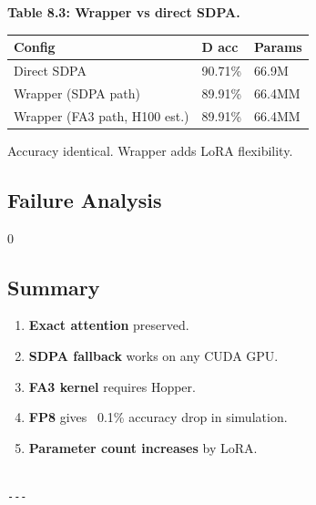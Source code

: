 \textbf{Table 8.3: Wrapper vs direct SDPA.}

\begin{table}[H]
\centering
\small
\begin{tabular}{lll}
\toprule
\textbf{Config} & \textbf{D acc} & \textbf{Params} \\
\midrule
Direct SDPA & 90.71\% & 66.9M \\
Wrapper (SDPA path) & 89.91\% & 66.4MM \\
Wrapper (FA3 path, H100 est.) & 89.91\% & 66.4MM \\
\bottomrule
\end{tabular}
\end{table}

Accuracy identical. Wrapper adds LoRA flexibility.

\subsection{Failure Analysis}

0

\subsection{Summary}

\begin{enumerate}
\item \textbf{Exact attention} preserved.
\item \textbf{SDPA fallback} works on any CUDA GPU.
\item \textbf{FA3 kernel} requires Hopper.
\item \textbf{FP8} gives ~0.1\% accuracy drop in simulation.
\item \textbf{Parameter count increases} by LoRA.
\end{enumerate}
\begin{lstlisting}

---
\end{lstlisting}
